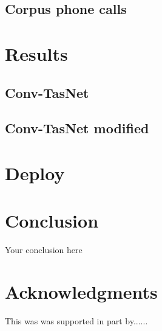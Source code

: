 \documentclass{article}
\begin{document}
\subsection{Corpus phone calls}



\section{Results}

\subsection{Conv-TasNet}
\subsection{Conv-TasNet modified}

\section{Deploy}




\section{Conclusion}
Your conclusion here

\section*{Acknowledgments}
This was was supported in part by......

  
  
\end{document}
